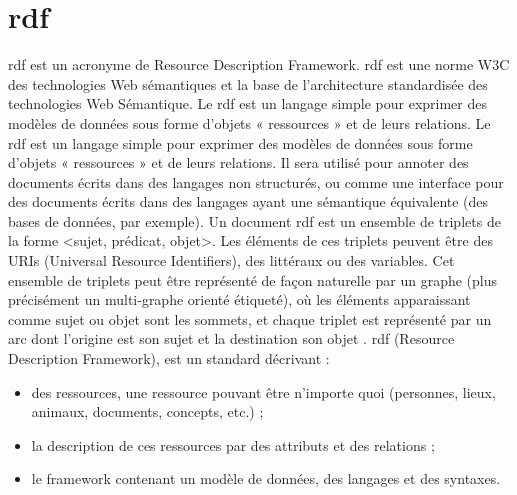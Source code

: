 \documentclass[12pt]{report}
\begin{document}
\section{\acs{rdf}}
\acs{rdf} est un acronyme de Resource Description Framework. \acs{rdf} est une norme W3C des technologies Web sémantiques et la base de l’architecture standardisée des technologies Web Sémantique. Le \acs{rdf} est un langage simple pour exprimer des modèles de données sous forme d'objets « ressources » et de leurs relations.
Le \acs{rdf} est un langage simple pour exprimer des
modèles de données sous forme d'objets « ressources » et de leurs relations. Il sera utilisé pour annoter des documents écrits
dans des langages non structurés, ou comme une interface pour des documents écrits dans des langages ayant une
sémantique équivalente (des bases de données, par exemple).
Un document \acs{rdf} est un ensemble de triplets de la forme <sujet, prédicat, objet>. Les éléments de ces triplets peuvent être
des URIs (Universal Resource Identifiers), des littéraux ou des variables. Cet ensemble de triplets peut être représenté de façon
naturelle par un graphe (plus précisément un multi-graphe orienté étiqueté), où les éléments apparaissant comme sujet ou objet
sont les sommets, et chaque triplet est représenté par un arc dont l’origine est son sujet et la destination son objet .\cite{SEMANTCWEB}
\acs{rdf} (Resource Description Framework), est un standard décrivant :
\begin{itemize}
 \item des ressources, une ressource pouvant être n'importe quoi (personnes, lieux, animaux, documents,
concepts, etc.) ;
\item la description de ces ressources par des attributs et des relations ;
\item le framework contenant un modèle de données, des langages et des syntaxes.
\end{itemize}
\end{document}
